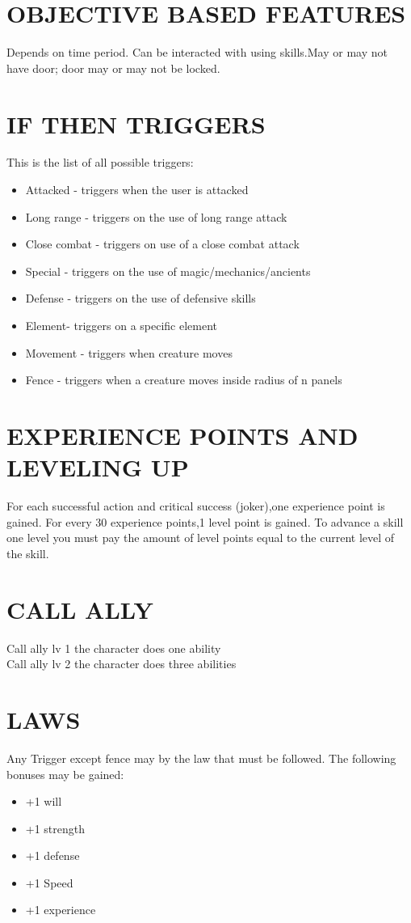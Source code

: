 \section{OBJECTIVE BASED FEATURES}
Depends on time period.  Can be interacted with using skills.May or may not have door; door may or may not be locked.
\section{IF THEN TRIGGERS}
This is the list of all possible triggers:
\begin{itemize}
\item Attacked - triggers when the user is attacked
\item Long range - triggers on the use of long range attack
\item Close combat - triggers on use of a close combat attack
\item Special - triggers on the use of magic/mechanics/ancients
\item Defense - triggers on the use of defensive skills
\item Element- triggers on a specific element
\item Movement - triggers when creature moves
\item Fence - triggers when a creature moves inside radius of n panels
\end{itemize}

\section{EXPERIENCE POINTS AND LEVELING UP}
For each successful action and critical success (joker),one experience point is gained.  For every 30 experience points,1 level point is gained.  To advance a skill one level you must pay the amount of level points equal to the current level of the skill.
\section{CALL ALLY}
Call ally lv 1 the character does one ability\\
Call ally lv 2 the character does three abilities\\
\section{LAWS}
Any Trigger except fence may by the law that must be followed.  The following bonuses may be gained:
\begin{itemize}
\item +1 will
\item +1 strength
\item +1 defense
\item +1 Speed
\item +1 experience
\end{itemize}
